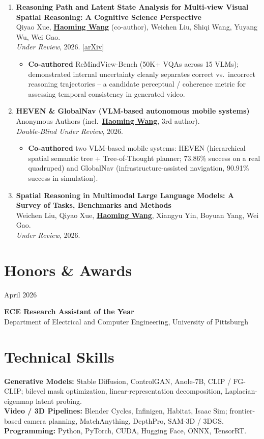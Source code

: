 \documentclass[11pt, letterpaper]{article}
\newenvironment{datedentry}[1]{%
  \par\noindent
  \begin{minipage}[t]{2.8cm}\raggedright\small #1\end{minipage}%
  \hspace{0.3cm}%
  \begin{minipage}[t]{\dimexpr\linewidth-3.1cm\relax}\raggedright
}{\end{minipage}\par\medskip}
\newenvironment{publist}{
  \begin{enumerate}[leftmargin=1.7em, itemsep=4pt, parsep=0pt, topsep=2pt, label=\arabic*.]
}{\end{enumerate}}
\newcommand{\impactbullet}[1]{%
  \par\vspace{1pt}%
  \begin{itemize}[leftmargin=1.2em, topsep=0pt, itemsep=0pt, parsep=0pt, partopsep=0pt]
    \item #1
  \end{itemize}}
\newcommand{\me}{\underline{\textbf{Haoming Wang}}}
\newcommand{\meco}{\underline{\textbf{Haoming Wang}} (co-author)}
\newcommand{\meanon}{\underline{\textbf{Haoming Wang}}}
\begin{document}
\begin{publist}
\item \textbf{Reasoning Path and Latent State Analysis for Multi-view Visual Spatial Reasoning: A Cognitive Science Perspective}\\
Qiyao Xue, \meco, Weichen Liu, Shiqi Wang, Yuyang Wu, Wei Gao.\\
\textit{Under Review}, 2026. \href{https://arxiv.org/abs/2512.02340}{[arXiv]}
\impactbullet{\textbf{Co-authored} ReMindView-Bench (50K+ VQAs across 15 VLMs); demonstrated internal uncertainty cleanly separates correct vs.\ incorrect reasoning trajectories -- a candidate perceptual / coherence metric for assessing temporal consistency in generated video.}

\item \textbf{HEVEN \& GlobalNav (VLM-based autonomous mobile systems)}\\
Anonymous Authors (incl.\ \meanon, 3rd author).\\
\textit{Double-Blind Under Review}, 2026.
\impactbullet{\textbf{Co-authored} two VLM-based mobile systems: HEVEN (hierarchical spatial semantic tree + Tree-of-Thought planner; 73.86\% success on a real quadruped) and GlobalNav (infrastructure-assisted navigation, 90.91\% success in simulation).}

\item \textbf{Spatial Reasoning in Multimodal Large Language Models: A Survey of Tasks, Benchmarks and Methods}\\
Weichen Liu, Qiyao Xue, \me, Xiangyu Yin, Boyuan Yang, Wei Gao.\\
\textit{Under Review}, 2026.
\end{publist}

\section{Honors \& Awards}

\begin{datedentry}{April 2026}
\textbf{ECE Research Assistant of the Year}\\
Department of Electrical and Computer Engineering, University of Pittsburgh
\end{datedentry}

\section{Technical Skills}
\textbf{Generative Models:} Stable Diffusion, ControlGAN, Anole-7B, CLIP / FG-CLIP; bilevel mask optimization, linear-representation decomposition, Laplacian-eigenmap latent probing.\\[2pt]
\textbf{Video / 3D Pipelines:} Blender Cycles, Infinigen, Habitat, Isaac Sim; frontier-based camera planning, MatchAnything, DepthPro, SAM-3D / 3DGS.\\[2pt]
\textbf{Programming:} Python, PyTorch, CUDA, Hugging Face, ONNX, TensorRT.
\end{document}
